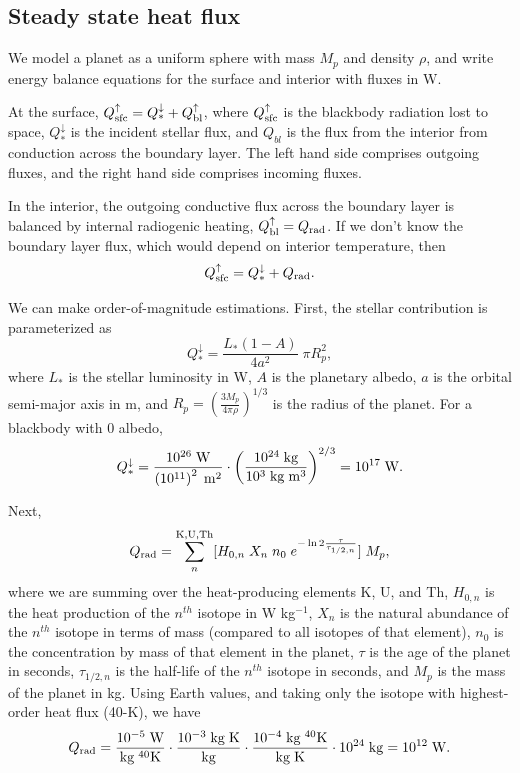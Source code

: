\documentclass[10pt,a4paper]{article}
\begin{document}
\subsection{Steady state heat flux}

We model a planet as a uniform sphere with mass $M_p$ and density $\rho$, and write energy balance equations for the surface and interior with fluxes in W. 

At the surface, $Q_{\rm sfc}^{\uparrow} = Q_*^{\downarrow} + Q^{\uparrow}_{\rm bl}$, where $Q_{\rm sfc}^{\uparrow}$ is the blackbody radiation lost to space, $Q_*^{\downarrow}$ is the incident stellar flux, and $Q_{bl}$ is the flux from the interior from conduction across the boundary layer. The left hand side comprises outgoing fluxes, and the right hand side comprises incoming fluxes. 

In the interior, the outgoing conductive flux across the boundary layer is balanced by internal radiogenic heating, $Q^{\uparrow}_{\rm bl} = Q_{\rm rad}$. If we don't know the boundary layer flux, which would depend on interior temperature, then
\begin{equation}
Q_{\rm sfc}^{\uparrow} = Q_*^{\downarrow} + Q_{\rm rad}.
\end{equation}

We can make order-of-magnitude estimations. First, the stellar contribution is parameterized as
\begin{equation}
Q_*^{\downarrow} = \frac{L_*(1-A)}{4a^2} \; \pi R_p^2,
\end{equation}
where $L_*$ is the stellar luminosity in W, $A$ is the planetary albedo, $a$ is the orbital semi-major axis in m, and $R_p = \left(\frac{3M_p}{4 \pi \rho}\right)^{1/3}$ is the radius of the planet. For a blackbody with 0 albedo, 
\begin{equation}
Q_*^{\downarrow} = \frac{10^{26} \; {\rm W}}{\left(10^{11}\right)^2 \; \rm{m}^2} \cdot \left(\frac{10^{24}\;{\rm kg}}{10^3 \; {\rm kg}\;{\rm m}^3}\right)^{2/3} = 10^{17} \; {\rm W}.
\end{equation}


Next,
\begin{equation}
Q_{\rm rad} = \sum^{\rm K, U, Th}_n [ H_{0, n} \; X_n \; n_0 \; e^{-\ln 2 \frac{\tau}{\tau_{1/2 ,n}}} ] \; M_p,
\end{equation}
where we are summing over the heat-producing elements K, U, and Th, $H_{0, n}$ is the heat production of the $n^{th}$ isotope in W kg$^{-1}$, $X_n$ is the natural abundance of the $n^{th}$ isotope in terms of mass (compared to all isotopes of that element), $n_0$ is the concentration by mass of that element in the planet, $\tau$ is the age of the planet in seconds,  $\tau_{1/2 ,n}$ is the half-life of the $n^{th}$ isotope in seconds, and $M_p$ is the mass of the planet in kg. Using Earth values, and taking only the isotope with highest-order heat flux (40-K), we have
\begin{equation}
Q_{\rm rad} = \frac{10^{-5}\;{\rm W}}{{\rm kg}\;^{40}{\rm K}} \cdot \frac{10^{-3}\;\rm{kg\;K}}{\rm kg} \cdot \frac{10^{-4}\;{\rm kg}\;^{40}{\rm K}}{\rm{kg\;K}} \cdot 10^{24} \; {\rm kg} = 10^{12} \; {\rm W}.
\end{equation}
\end{document}
